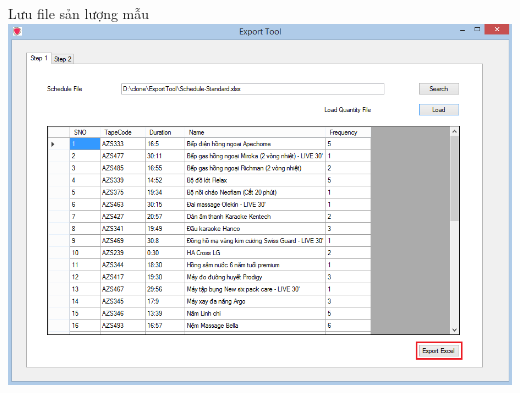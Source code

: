\documentclass[11pt]{article}
\begin{document}
	Lưu file sản lượng mẫu\\
	\includegraphics[width=140mm]{im5.png}\\
\end{document}
